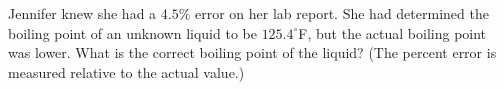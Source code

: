 Jennifer knew she had a $4.5\%$ error on her lab report. She had determined the boiling point of an unknown liquid to be $125.4^\circ$F, but the actual boiling point was lower. What is the correct boiling point of the liquid? (The percent error is measured relative to the actual value.)
